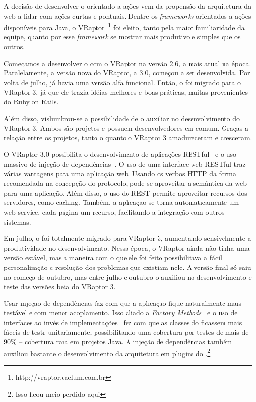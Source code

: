 A decisão de desenvolver o \calopsita{} orientado a ações vem da propensão da arquitetura da web a lidar com ações curtas e pontuais. Dentre os \textit{frameworks} orientados a ações disponíveis para Java, o VRaptor~\footnote{http://vraptor.caelum.com.br} foi eleito, tanto pela maior familiaridade da equipe, quanto por esse \textit{framework} se mostrar mais produtivo e simples que os outros.

Começamos a desenvolver o \calopsita{} com o VRaptor na versão 2.6, a mais atual na época. Paralelamente, a versão nova do VRaptor, a 3.0, começou a ser desenvolvida. Por volta de julho, já havia uma versão alfa funcional. Então, o \calopsita{} foi migrado para o VRaptor 3, já que ele trazia idéias melhores e boas práticas, muitas provenientes do Ruby on Rails. 

Além disso, vislumbrou-se a possibilidade de o \calopsita{} auxiliar no desenvolvimento do VRaptor 3. Ambos são projetos \opensource{} e possuem desenvolvedores em comum. Graças a relação entre os projetos, tanto o \calopsita{} quanto o VRaptor 3 amadureceram e cresceram.

O VRaptor 3.0 possibilita o desenvolvimento de aplicações RESTful~\cite{rest} e o uso massivo de injeção de dependências~\cite{di}. O uso de uma interface web RESTful traz várias vantagens para uma aplicação web. Usando os verbos HTTP da forma recomendada na concepção do protocolo, pode-se aproveitar a semântica da web para uma aplicação. Além disso, o uso do REST permite aproveitar recursos dos servidores, como caching. Também, a aplicação se torna automaticamente um web-service, cada página um recurso, facilitando a integração com outros sistemas.

Em julho, o \calopsita{} foi totalmente migrado para VRaptor 3, aumentando sensivelmente a produtividade no desenvolvimento. Nessa época, o VRaptor ainda não tinha uma versão estável, mas a maneira com o que ele foi feito possibilitava a fácil personalização e resolução dos problemas que existiam nele. A versão final só saiu no começo de outubro, mas entre julho e outubro o \calopsita{} auxiliou no desenvolvimento e teste das versões beta do VRaptor 3.

Usar injeção de dependências faz com que a aplicação fique naturalmente mais testável e com menor acoplamento. Isso aliado a \textit{Factory Methods}~\cite{gof} e o uso de interfaces ao invés de implementações~\cite{effective} fez com que as classes do \calopsita{} ficassem mais fáceis de testr unitariamente, possibilitando uma cobertura por testes de mais de 90\% -- cobertura rara em projetos Java. A injeção de dependências também auxiliou bastante o desenvolvimento da arquitetura em plugins do \calopsita{}.\footnote{Isso ficou meio perdido aqui}

